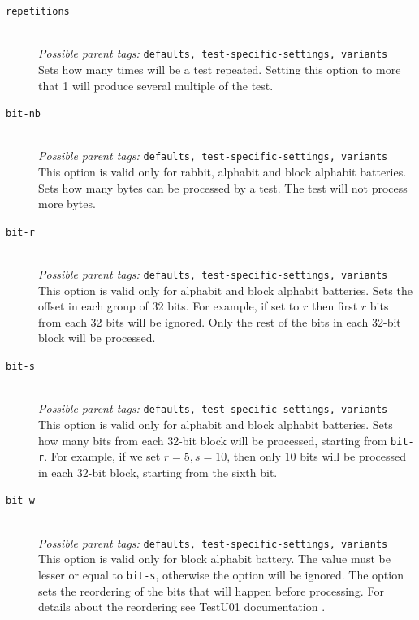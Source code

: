 \documentclass[
	digital,    %
	oneside,
	color,
	11pt,
	nocover,
	notable,
	nolof,
	nolot,
]{fithesis3}
\theoremstyle{definition}
\theoremstyle{remark}
\begin{document}
\begin{description}
\item[\texttt{repetitions}] \hfill \\
\textit{Possible parent tags: } \texttt{defaults, test-specific-settings, variants} \\
Sets how many times will be a test repeated. Setting this option to more that 1 will produce several multiple of the test.

\item[\texttt{bit-nb}] \hfill \\
\textit{Possible parent tags: } \texttt{defaults, test-specific-settings, variants} \\
This option is valid only for rabbit, alphabit and block alphabit batteries. Sets how many bytes can be processed by a test. The test will not process more bytes.

\item[\texttt{bit-r}] \hfill \\
\textit{Possible parent tags: } \texttt{defaults, test-specific-settings, variants} \\
This option is valid only for alphabit and block alphabit batteries. Sets the offset in each group of 32 bits. For example, if set to $r$ then first $r$ bits from each 32 bits will be ignored. Only the rest of the bits in each 32-bit block will be processed.

\item[\texttt{bit-s}] \hfill \\
\textit{Possible parent tags: } \texttt{defaults, test-specific-settings, variants} \\
This option is valid only for alphabit and block alphabit batteries. Sets how many bits from each 32-bit block will be processed, starting from \texttt{bit-r}. For example, if we set $r=5, s=10$, then only 10 bits will be processed in each 32-bit block, starting from the sixth bit.

\item[\texttt{bit-w}] \hfill \\
\textit{Possible parent tags: } \texttt{defaults, test-specific-settings, variants} \\
This option is valid only for block alphabit battery. The value must be lesser or equal to \texttt{bit-s}, otherwise the option will be ignored. The option sets the reordering of the bits that will happen before processing. For details about the reordering see TestU01 documentation \cite[p.~155]{testu01-documentation}.


\end{description}
\end{document}

